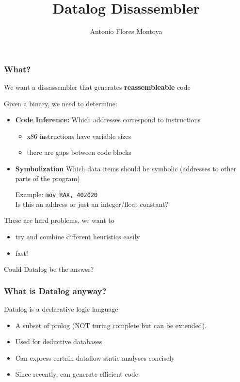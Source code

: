 \documentclass[]{beamer}
\author{Antonio Flores Montoya}
\title{Datalog Disassembler}
\begin{document}
\maketitle


\begin{frame}
  \frametitle{What?}
  \begin{block}{}We want a dissassembler that generates \textbf{reassembleable} code
  \end{block}

  Given a binary, we need to determine:
  \begin{itemize}
  \item \textbf{Code Inference:} Which addresses correspond to instructions
    \begin{itemize}
    \item x86 instructions have variable sizes
    \item there are gaps between code blocks
    \end{itemize}
    \pause
  \item \textbf{Symbolization} Which data items should  be symbolic
    (addresses to other parts of  the program)
    \pause


    Example: {\color{dblue}\lstinline{mov RAX, 402020}}\\
    Is this an address or just an integer/float constant?

  \end{itemize}
  \pause
  These are hard problems, we want to
  \begin{itemize}
  \item try and combine different heuristics easily
  \item fast!
  \end{itemize}
  Could Datalog be the answer?
\end{frame}


\begin{frame}
  \frametitle{What is Datalog anyway?}

    Datalog is a declarative logic language 

  \begin{itemize}
  \item A subset of prolog (NOT turing complete but can be extended).
  \item Used for deductive databases
  \item Can express certain dataflow static analyses concisely
  \item Since recently, can generate efficient code\\
  \end{itemize}
\end{frame}
\end{document}
